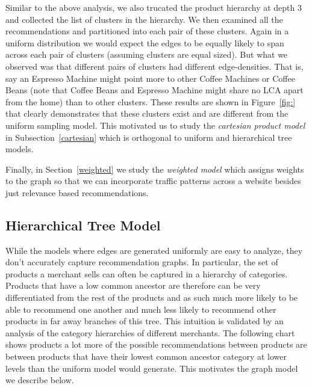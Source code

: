 Similar to the above analysis, we also trucated the product hierarchy
at depth 3 and collected the list of clusters in the hierarchy. We
then examined all the recommendations and partitioned into each pair
of these clusters. Again in a uniform distribution we would expect the
edges to be equally likely to span across each pair of clusters
(assuming clusters are equal sized). But what we observed was that
different pairs of clusters had different edge-densities. That is, say
an Espresso Machine might point more to other Coffee Machines or
Coffee Beans (note that Coffee Beans and Espresso Machine might share
no LCA apart from the home) than to other clusters. These results are
shown in Figure~\ref{fig:} that clearly demonstrates that these
clusters exist and are different from the uniform sampling model. This
motivated us to study the {\em cartesian product model} in
Subsection~\ref{cartesian} which is orthogonal to uniform and
hierarchical tree models.

Finally, in Section~\ref{weighted} we study the {\em weighted model}
which assigns weights to the graph so that we can incorporate traffic
patterns across a website besides just relevance based recommendations.

\subsection{Hierarchical Tree Model}
\label{hierarchy}

While the models where edges are generated uniformly are easy to analyze,
they don't accurately capture recommendation graphs. In particular, the
set of products a merchant sells can often be captured in a hierarchy of
categories. Products that have a low common ancestor are therefore can be
very differentiated from the rest of the products and as such much more
likely to be able to recommend one another and much less likely to recommend
other products in far away branches of this tree. This intuition is validated
by an analysis of the category hierarchies of different merchants. The following
chart shows products a lot more of the possible recommendations between 
products are between products that have their lowest common ancestor category
at lower levels than the uniform model would generate. This motivates the
graph model we describe below.



